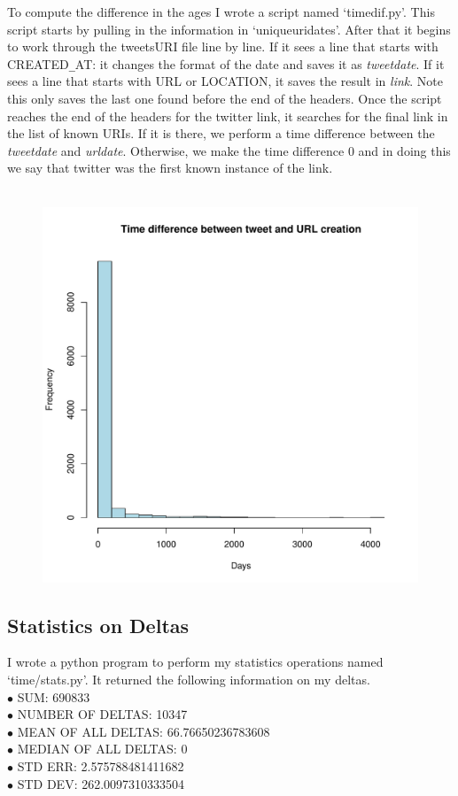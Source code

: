 \documentclass[12pt]{article}
\begin{document}
To compute the difference in the ages I wrote a script named `timedif.py'.  This script starts by pulling in the information in `uniqueuridates'.  After that it begins to work through the tweetsURI file line by line.  If it sees a line that starts with CREATED\texttt{\_}AT: it changes the format of the date and saves it as \textit{tweetdate}.  If it sees a line that starts with URL or LOCATION, it saves the result in \textit{link}. Note this only saves the last one found before the end of the headers.  Once the script reaches the end of the headers for the twitter link, it searches for the final link in the list of known URIs.  If it is there, we perform a time difference between the \textit{tweetdate} and \textit{urldate}.  Otherwise, we make the time difference 0 and in doing this we say that twitter was the first known instance of the link.

\begin{figure}[H]
    \centering
    \includegraphics{timedif.pdf}
\end{figure}

\subsection{Statistics on Deltas}
I wrote a python program to perform my statistics operations named `time/stats.py'.  It returned the following information on my deltas.\\
$\bullet$ SUM:  690833\\
$\bullet$ NUMBER OF DELTAS:  10347\\
$\bullet$ MEAN OF ALL DELTAS:  66.76650236783608\\
$\bullet$ MEDIAN OF ALL DELTAS:  0\\
$\bullet$ STD ERR:  2.575788481411682\\
$\bullet$ STD DEV:  262.0097310333504\\
\end{document}
